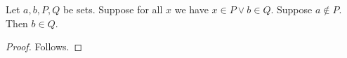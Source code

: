 \begin{proposition}\label{obvious_universal_hint}
    Let $a,b,P,Q$ be sets.
    Suppose for all $x$ we have $x\in P\lor b\in Q$.
    Suppose $a\notin P$.
    Then $b\in Q$.
\end{proposition}
\begin{proof}
    Follows.
\end{proof}

